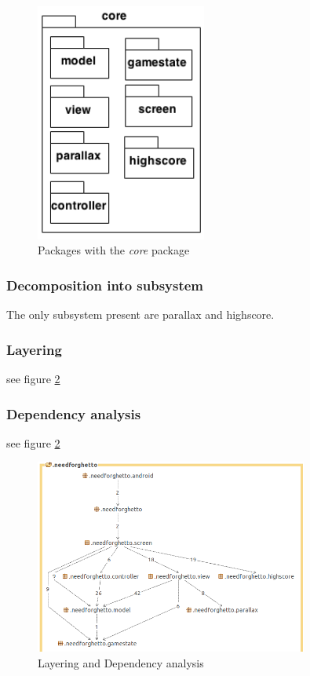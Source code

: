 \documentclass{article}
\begin{document}
  \begin{figure}[h]
  \centering
  \includegraphics[width=0.5\textwidth]{core.png}
  \caption{Packages with the \textit{core} package}
  \label{fig:core}
  \end{figure}


\subsubsection{Decomposition into subsystem}
The only subsystem present are parallax and highscore.

\subsubsection{Layering}
see figure \ref{fig:stan}

\subsubsection{Dependency analysis}
see figure \ref{fig:stan}


\begin{figure}[h]
  \centering
  \includegraphics[width=0.8\textwidth]{stan.png}
  \caption{Layering and Dependency analysis}
  \label{fig:stan}
\end{figure}
\end{document}
